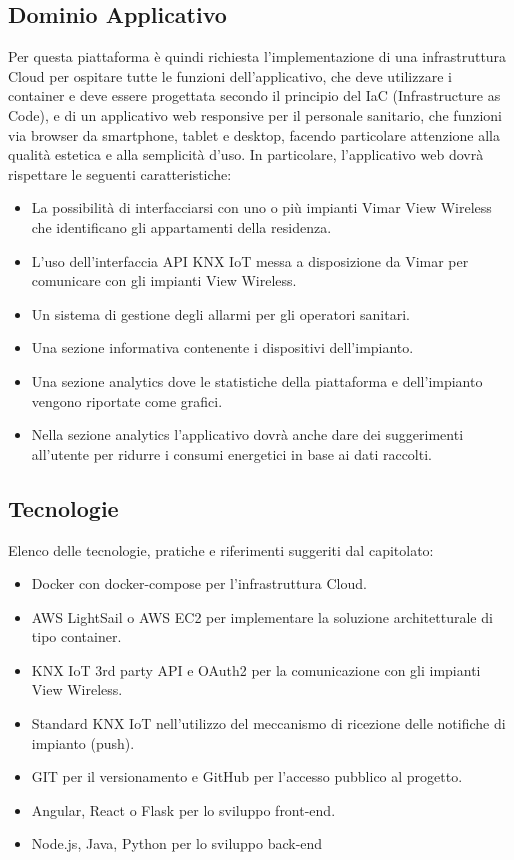 \documentclass[a4paper,12pt]{article}
\begin{document}
    \subsection{Dominio Applicativo}
    Per questa piattaforma è quindi richiesta l’implementazione di una infrastruttura Cloud per ospitare tutte le funzioni dell’applicativo, che deve utilizzare i container e deve essere progettata secondo il principio del IaC (Infrastructure as Code), e di un applicativo web responsive per il personale sanitario, che funzioni via browser da smartphone, tablet e desktop, facendo particolare attenzione alla qualità estetica e alla semplicità d’uso.
    In particolare, l’applicativo web dovrà rispettare le seguenti caratteristiche:
    \begin{itemize}
        \item La possibilità di interfacciarsi con uno o più impianti Vimar View Wireless che identificano gli appartamenti della residenza.
		\item L’uso dell’interfaccia API KNX IoT messa a disposizione da Vimar per comunicare con gli impianti View Wireless.
		\item Un sistema di gestione degli allarmi per gli operatori sanitari.
		\item Una sezione informativa contenente i dispositivi dell’impianto.
		\item Una sezione analytics dove le statistiche della piattaforma e dell’impianto vengono riportate come grafici.
		\item Nella sezione analytics l’applicativo dovrà anche dare dei suggerimenti all’utente per ridurre i consumi energetici in base ai dati raccolti.
    \end{itemize}
    \subsection{Tecnologie}
    Elenco delle tecnologie, pratiche e riferimenti suggeriti dal capitolato:
    \begin{itemize}
		\item Docker con docker-compose per l’infrastruttura Cloud.
		\item AWS LightSail o AWS EC2 per implementare la soluzione architetturale di tipo container.
		\item KNX IoT 3rd party API e OAuth2 per la comunicazione con gli impianti View Wireless.
		\item Standard KNX IoT nell’utilizzo del meccanismo di ricezione delle notifiche di impianto (push).
		\item GIT per il versionamento e GitHub per l’accesso pubblico al progetto.
		\item Angular, React o Flask per lo sviluppo front-end.
		\item Node.js, Java, Python per lo sviluppo back-end
    \end{itemize}
\end{document}
